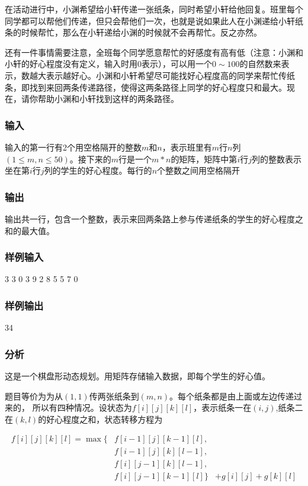 在活动进行中，小渊希望给小轩传递一张纸条，同时希望小轩给他回复。班里每个同学都可以帮他们传递，但只会帮他们一次，也就是说如果此人在小渊递给小轩纸条的时候帮忙，那么在小轩递给小渊的时候就不会再帮忙。反之亦然。

还有一件事情需要注意，全班每个同学愿意帮忙的好感度有高有低（注意：小渊和小轩的好心程度没有定义，输入时用0表示），可以用一个$0 \sim 100$的自然数来表示，数越大表示越好心。小渊和小轩希望尽可能找好心程度高的同学来帮忙传纸条，即找到来回两条传递路径，使得这两条路径上同学的好心程度只和最大。现在，请你帮助小渊和小轩找到这样的两条路径。

\subsubsection{输入}
输入的第一行有2个用空格隔开的整数$m$和$n$，表示班里有$m$行$n$列$(1 \leq m,n \leq 50)$。接下来的$m$行是一个$m*n$的矩阵，矩阵中第$i$行$j$列的整数表示坐在第$i$行$j$列的学生的好心程度。每行的$n$个整数之间用空格隔开

\subsubsection{输出}
输出共一行，包含一个整数，表示来回两条路上参与传递纸条的学生的好心程度之和的最大值。

\subsubsection{样例输入}
\begin{Code}
3 3
0 3 9
2 8 5
5 7 0
\end{Code}

\subsubsection{样例输出}
\begin{Code}
34
\end{Code}

\subsubsection{分析}
这是一个棋盘形动态规划。用矩阵存储输入数据，即每个学生的好心值。

题目等价为为从$(1,1)$传两张纸条到$(m,n)$。每个纸条都是由上面或左边传递过来的， 所以有四种情况。设状态为$f[i][j][k][l]$，表示纸条一在$(i,j)$,纸条二在$(k,l)$的好心程度之和，状态转移方程为

\begin{eqnarray}
f[i][j][k][l] = \max\{ & f[i-1][j][k-1][l], & \nonumber \\
                            & f[i-1][j][k][l-1], & \nonumber \\
							& f[i][j-1][k][l-1], & \nonumber \\
                            & f[i][j-1][k-1][l]\} & +g[i][j]+g[k][l] \nonumber
\end{eqnarray}

